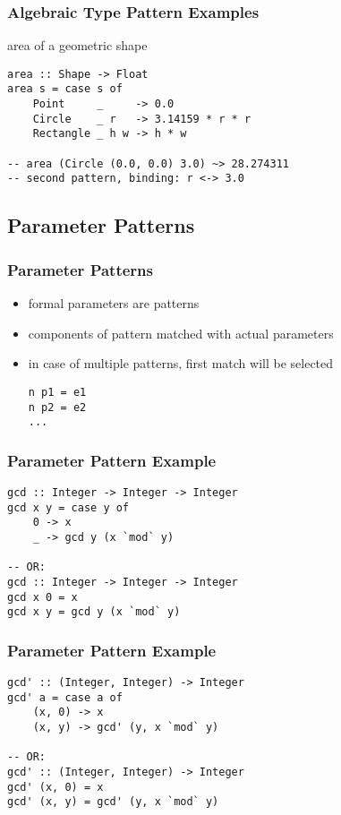 \documentclass[dvipsnames]{beamer}
\theoremstyle{plain}
\begin{document}
\begin{frame}[fragile]
  \frametitle{Algebraic Type Pattern Examples}

  \begin{exampleblock}{area of a geometric shape}
    \begin{lstlisting}
area :: Shape -> Float
area s = case s of
    Point     _     -> 0.0
    Circle    _ r   -> 3.14159 * r * r
    Rectangle _ h w -> h * w

-- area (Circle (0.0, 0.0) 3.0) ~> 28.274311
-- second pattern, binding: r <-> 3.0
    \end{lstlisting}
  \end{exampleblock}
\end{frame}

\subsection{Parameter Patterns}

\begin{frame}[fragile]
  \frametitle{Parameter Patterns}

  \begin{itemize}
    \item formal parameters are patterns
    \item components of pattern matched with actual parameters

    \medskip
    \item in case of multiple patterns, first match will be selected

    \smallskip
    \begin{lstlisting}[style=syntax]
n p1 = e1
n p2 = e2
...
    \end{lstlisting}
  \end{itemize}
\end{frame}

\begin{frame}[fragile]
  \frametitle{Parameter Pattern Example}

  \begin{lstlisting}
gcd :: Integer -> Integer -> Integer
gcd x y = case y of
    0 -> x
    _ -> gcd y (x `mod` y)

-- OR:
gcd :: Integer -> Integer -> Integer
gcd x 0 = x
gcd x y = gcd y (x `mod` y)
  \end{lstlisting}
\end{frame}

\begin{frame}[fragile]
  \frametitle{Parameter Pattern Example}

  \begin{lstlisting}
gcd' :: (Integer, Integer) -> Integer
gcd' a = case a of
    (x, 0) -> x
    (x, y) -> gcd' (y, x `mod` y)

-- OR:
gcd' :: (Integer, Integer) -> Integer
gcd' (x, 0) = x
gcd' (x, y) = gcd' (y, x `mod` y)
  \end{lstlisting}
\end{frame}
\end{document}
